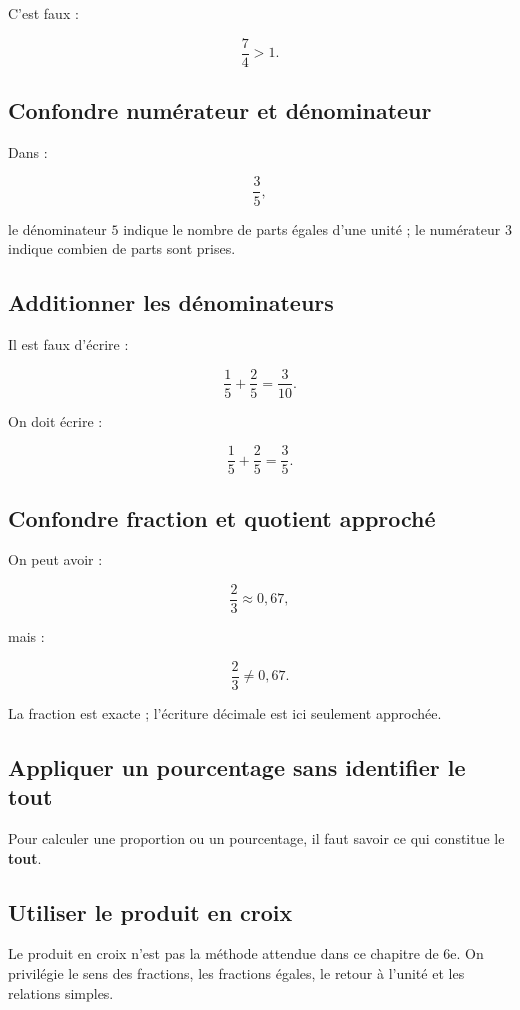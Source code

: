 C’est faux :

\[
\dfrac{7}{4}>1.
\]

\subsection{Confondre numérateur et dénominateur}

Dans :

\[
\dfrac{3}{5},
\]

le dénominateur $5$ indique le nombre de parts égales d’une unité ; le numérateur $3$ indique combien de parts sont prises.

\subsection{Additionner les dénominateurs}

Il est faux d’écrire :

\[
\dfrac{1}{5}+\dfrac{2}{5}
=
\dfrac{3}{10}.
\]

On doit écrire :

\[
\dfrac{1}{5}+\dfrac{2}{5}
=
\dfrac{3}{5}.
\]

\subsection{Confondre fraction et quotient approché}

On peut avoir :

\[
\dfrac{2}{3}\approx0{,}67,
\]

mais :

\[
\dfrac{2}{3}\neq0{,}67.
\]

La fraction est exacte ; l’écriture décimale est ici seulement approchée.

\subsection{Appliquer un pourcentage sans identifier le tout}

Pour calculer une proportion ou un pourcentage, il faut savoir ce qui constitue le \textbf{tout}.

\subsection{Utiliser le produit en croix}

Le produit en croix n’est pas la méthode attendue dans ce chapitre de 6e. On privilégie le sens des fractions, les fractions égales, le retour à l’unité et les relations simples.


